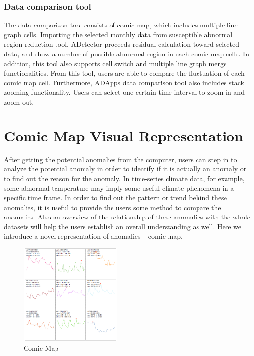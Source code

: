 \documentclass{vgtc}                          %
\begin{document}
\subsubsection{Data comparison tool}

The data comparison tool consists of comic map, which includes multiple line graph cells. Importing the selected monthly data from susceptible abnormal region reduction tool, ADetector proceeds residual calculation toward selected data, and show a number of possible abnormal region in each comic map cells. In addition, this tool also supports cell switch and multiple line graph merge functionalities. From this tool, users are able to compare the fluctuation of each comic map cell. Furthermore, ADApps data comparison tool also includes stack zooming functionality. Users can select one certain time interval to zoom in and zoom out. 

\section{Comic Map Visual Representation}

After getting the potential anomalies from the computer, users can step in to analyze the potential anomaly in order to identify if it is actually an anomaly or to find out the reason for the anomaly. In time-series climate data, for example, some abnormal temperature may imply some useful climate phenomena in a specific time frame. In order to find out the pattern or trend behind these anomalies, it is useful to provide the users some method to compare the anomalies. Also an overview of the relationship of these anomalies with the whole datasets will help the users establish an overall understanding as well. Here we introduce a novel representation of anomalies – comic map. 

 \begin{figure}[htb]
	\centering
  \includegraphics[width=0.45\textwidth]{comicMap9Cell.jpg}
  \caption{Comic Map}
\end{figure}
\end{document}
